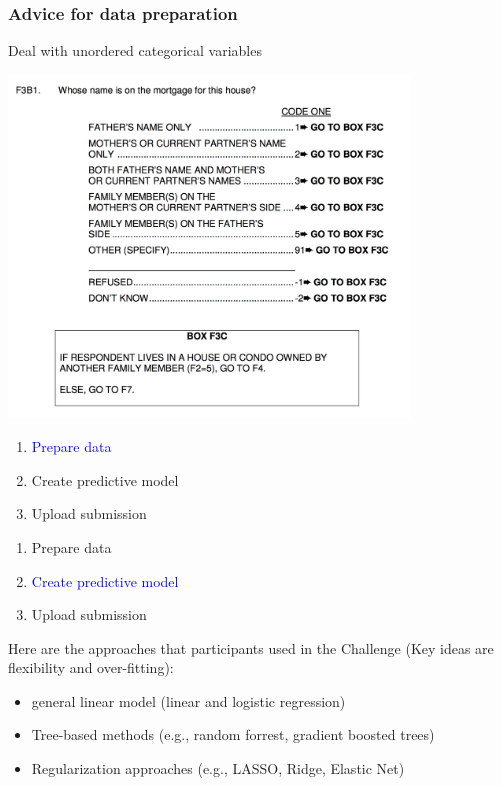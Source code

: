 \documentclass[aspectratio=169]{beamer}
\begin{document}
\begin{frame}
\frametitle{Advice for data preparation}

Deal with unordered categorical variables

\begin{center}
\includegraphics[width=0.8\textwidth]{figures/f5f3b1}
\end{center}

\end{frame}
\begin{frame}

\begin{enumerate}
\item \textcolor{blue}{Prepare data}
\item Create predictive model
\item Upload submission
\end{enumerate}

\end{frame}
\begin{frame}

\begin{enumerate}
\item Prepare data
\item \textcolor{blue}{Create predictive model}
\item Upload submission
\end{enumerate}

\end{frame}
\begin{frame}
Here are the approaches that participants used in the Challenge (Key ideas are flexibility and over-fitting):

\begin{itemize}
\item general linear model (linear and logistic regression)
\item Tree-based methods (e.g., random forrest, gradient boosted trees)
\item Regularization approaches (e.g., LASSO, Ridge, Elastic Net)
\end{itemize}

\end{frame}
\end{document}
